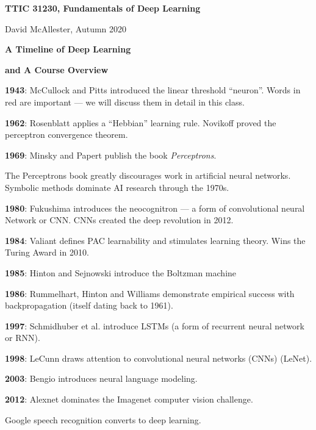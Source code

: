 




{\Huge
  \centerline{\bf TTIC 31230,  Fundamentals of Deep Learning}
  \vfill
  \centerline{David McAllester, Autumn 2020}
  \vfill
  \centerline{\bf A Timeline of Deep Learning}
  \vfill
  \centerline{\bf and A Course Overview}
\vfill
\vfill



{\bf 1943}: McCullock and Pitts introduced the {\color{red} linear threshold ``neuron''}. Words in red are important --- we will discuss them in detail in this class.

\vfill
{\bf 1962}: Rosenblatt applies a ``Hebbian'' learning rule.  Novikoff proved the perceptron convergence theorem.

\vfill
{\bf 1969}: Minsky and Papert publish the book {\it Perceptrons}.

\vfill
The Perceptrons book greatly discourages work in artificial neural networks.  Symbolic methods dominate AI research through the 1970s.


{\bf 1980}: Fukushima introduces the neocognitron --- a form of {\color{red} convolutional neural Network or CNN}.  CNNs created the deep revolution in 2012.

\vfill
{\bf 1984}: Valiant defines PAC learnability and stimulates learning theory. Wins the Turing Award in 2010.

\vfill
{\bf 1985}: Hinton and Sejnowski introduce the Boltzman machine

\vfill
{\bf 1986}: Rummelhart, Hinton and Williams demonstrate empirical success with {\color{red} backpropagation} (itself dating back to 1961).


{\bf 1997}: Schmidhuber et al. introduce LSTMs (a form of {\color{red} recurrent neural network or RNN}).

\vfill
{\bf 1998}: LeCunn draws attention to convolutional neural networks (CNNs) (LeNet).

\vfill
{\bf 2003}: Bengio introduces {\color{red} neural language modeling}.


{\bf 2012}: Alexnet dominates the Imagenet computer vision challenge.

\vfill
Google speech recognition converts to deep learning.

}
